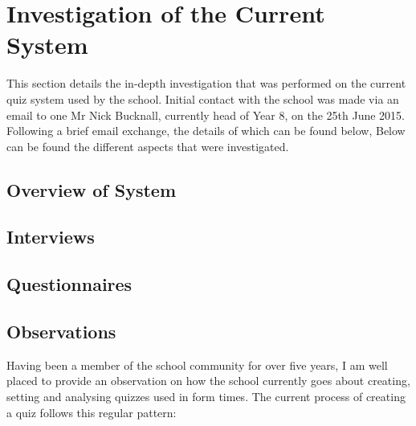\section{Investigation of the Current System}
This section details the in-depth investigation that was performed on the current quiz system used by the school. Initial contact with the school was made via an email to one Mr Nick Bucknall, currently head of Year 8, on the 25th June 2015. Following a brief email exchange, the details of which can be found below, Below can be found the different aspects that were investigated.

\subsection{Overview of System}

\subsection{Interviews}

\subsection{Questionnaires}

\subsection{Observations}
Having been a member of the school community for over five years, I am well placed to provide an observation on how the school currently goes about creating, setting and analysing quizzes used in form times. The current process of creating a quiz follows this regular pattern:

